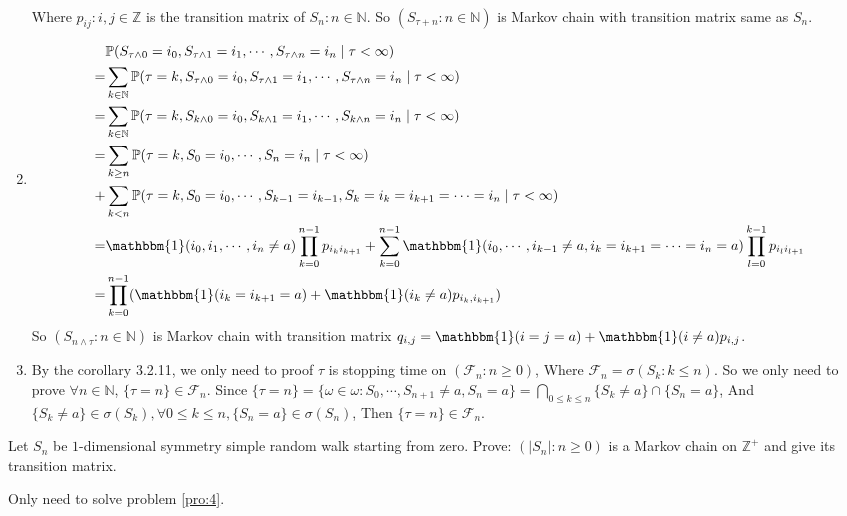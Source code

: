 \documentclass{ctexart}
\begin{document}
\begin{solution}
\begin{enumerate}
\[\begin{aligned}
        \end{aligned}
      \]
      Where \(p_{ij}:i,j \in \mathbb{Z}\) is the transition matrix of \(S_n:n \in \mathbb{N}\).
      So \((S_{\tau+n}:n \in \mathbb{N})\) is Markov chain with transition matrix same as \(S_n\).
    \item       \[
        \begin{aligned}
           & \mathbb{P}(S_{\tau \wedge 0}=i_0,S_{\tau\wedge 1}=i_1,\cdots,S_{\tau\wedge n}=i_n \mid \tau<\infty)
          \\= & \sum_{k \in \mathbb{N}}\mathbb{P}(\tau=k,S_{\tau \wedge 0}=i_0,S_{\tau\wedge 1}=i_1,\cdots,S_{\tau\wedge n}=i_n \mid \tau<\infty)
          \\= & \sum_{k \in \mathbb{N}}\mathbb{P}(\tau=k,S_{k \wedge 0}=i_0,S_{k\wedge 1}=i_1,\cdots,S_{k\wedge n}=i_n \mid \tau<\infty)
          \\= & \sum_{k \geq n} \mathbb{P}(\tau =k,S_0=i_0,\cdots,S_n=i_n \mid \tau<\infty)
          \\+ & \sum_{k < n} \mathbb{P}(\tau =k,S_0=i_0,\cdots,S_{k-1}=i_{k-1},S_k=i_k=i_{k+1} =\cdots=i_n \mid \tau<\infty)
          \\= & \mathbbm{1}(i_0,i_1,\cdots,i_n \neq a) \prod_{k=0}^{n-1} p_{i_k i_{k+1}} + \sum_{k=0}^{n-1} \mathbbm{1}(i_0,\cdots,i_{k-1} \neq a,i_k=i_{k+1}=\cdots=i_n=a) \prod_{l=0}^{k-1} p_{i_l i_{l+1}}
          \\=&\prod_{k=0}^{n-1} (\mathbbm{1}(i_k=i_{k+1}=a)+\mathbbm{1}(i_k \neq a)p_{i_k,i_{k+1}})
        \end{aligned}
      \]
      So \((S_{n \wedge \tau}:n \in \mathbb{N})\) is Markov chain with transition matrix \(q_{i,j}=\mathbbm{1}(i=j=a)+\mathbbm{1}(i \neq a)p_{i,j}\).
    \item By the corollary 3.2.11, we only need to proof \(\tau\) is stopping time on \((\mathscr{\mathcal{F}}_n:n \geq 0)\),
      Where \(\mathscr{\mathcal{F}}_n=\sigma(S_k:k \leq n)\).
      So we only need to prove \(\forall n \in \mathbb{N}\), \(\{\tau = n\} \in \mathscr{\mathcal{F}}_n\).
      Since \(\{\tau =n\}=\{\omega \in \omega: S_0,\cdots,S_{n + 1} \neq a, S_n = a\}=\bigcap_{0 \leq k \leq n}\{S_k \neq a\}\cap\{S_n=a\}\),
      And \(\{S_k \neq a\} \in \sigma(S_k), \forall 0 \leq k \leq n,\{S_n = a\} \in \sigma(S_n)\),
      Then \(\{\tau = n\} \in \mathscr{\mathcal{F}}_n\).
  \end{enumerate}
\end{solution}

\begin{problem}\label{pro:3}
  Let \(S_n\) be \(1\)-dimensional symmetry simple random walk starting from zero.
  Prove: \((|S_n|: n \geq 0)\) is a Markov chain on \(\mathbb{Z}^+\) and give its transition matrix.
\end{problem}
\begin{solution}
  Only need to solve problem \ref{pro:4}.
\end{solution}
\end{document}
